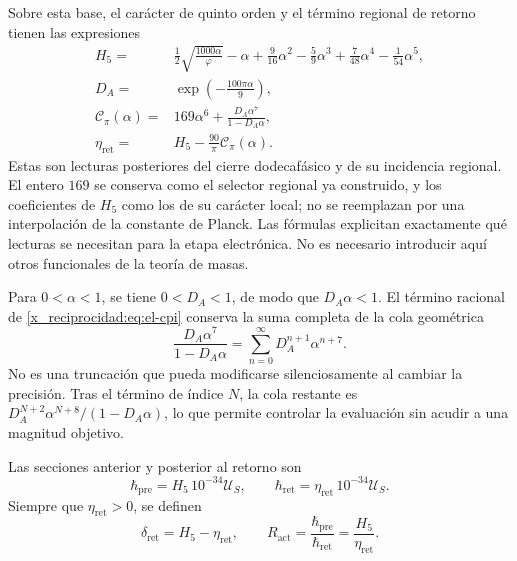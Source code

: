 Sobre esta base, el carácter de quinto orden y el término regional de
retorno tienen las expresiones
\begin{align}
 H_5={}&\frac12\sqrt{\frac{1000\alpha}{\varphi}}-\alpha
   +\frac9{16}\alpha^2-\frac59\alpha^3
   +\frac7{48}\alpha^4-\frac1{54}\alpha^5,
   \label{x_reciprocidad:eq:el-h5}\\
 D_A={}&\exp\!\left(-\frac{100\pi\alpha}{9}\right),
   \label{x_reciprocidad:eq:el-da}\\
 \mathcal C_\pi(\alpha)={}&169\alpha^6+
       \frac{D_A\alpha^7}{1-D_A\alpha},
   \label{x_reciprocidad:eq:el-cpi}\\
 \eta_{\mathrm{ret}}={}&H_5-\frac{90}{\pi}\mathcal C_\pi(\alpha).
   \label{x_reciprocidad:eq:el-eta}
\end{align}
Estas son lecturas posteriores del cierre dodecafásico y de su
incidencia regional. El entero \(169\) se conserva como el selector
regional ya construido, y los coeficientes de \(H_5\) como los de su
carácter local; no se reemplazan por una interpolación de la constante de
Planck. Las fórmulas explicitan exactamente qué lecturas se necesitan
para la etapa electrónica. No es necesario introducir aquí otros
funcionales de la teoría de masas.

Para \(0<\alpha<1\), se tiene \(0<D_A<1\), de modo que
\(D_A\alpha<1\). El término racional de \eqref{x_reciprocidad:eq:el-cpi} conserva la
suma completa de la cola geométrica
\begin{equation}
 \frac{D_A\alpha^7}{1-D_A\alpha}
 =\sum_{n=0}^{\infty}D_A^{n+1}\alpha^{n+7}.
 \label{x_reciprocidad:eq:el-cola-regional}
\end{equation}
No es una truncación que pueda modificarse silenciosamente al cambiar la
precisión. Tras el término de índice \(N\), la cola restante es
\(D_A^{N+2}\alpha^{N+8}/(1-D_A\alpha)\), lo que permite controlar la
evaluación sin acudir a una magnitud objetivo.

\begin{definition}
Las secciones anterior y posterior al retorno son
\begin{equation}
 \hbar_{\mathrm{pre}}=H_5\,10^{-34}\mathcal U_S,
 \qquad
 \hbar_{\mathrm{ret}}=\eta_{\mathrm{ret}}\,10^{-34}\mathcal U_S.
 \label{x_reciprocidad:eq:el-secciones-accion}
\end{equation}
Siempre que \(\eta_{\mathrm{ret}}>0\), se definen
\begin{equation}
 \delta_{\mathrm{ret}}=H_5-\eta_{\mathrm{ret}},\qquad
 R_{\mathrm{act}}=\frac{\hbar_{\mathrm{pre}}}{\hbar_{\mathrm{ret}}}
 =\frac{H_5}{\eta_{\mathrm{ret}}}.
 \label{x_reciprocidad:eq:el-ratio}
\end{equation}
\end{definition}

